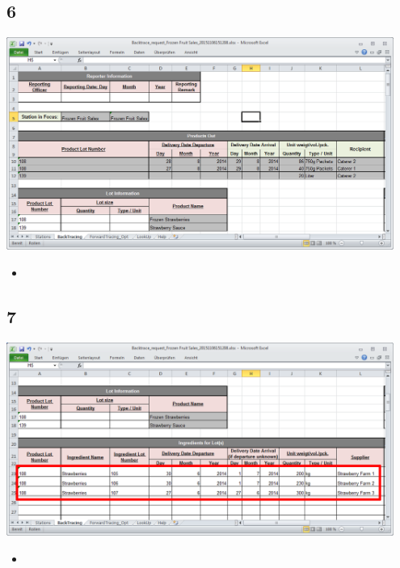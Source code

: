 \documentclass{beamer}
\begin{document}
\subsection{6}
\begin{frame}
	\begin{center}
  		\includegraphics[width=0.95\textwidth]{6.png}
	\end{center}
	\begin{itemize}
		\item
	\end{itemize}
\end{frame}

\subsection{7}
\begin{frame}
	\begin{center}
  		\includegraphics[width=0.95\textwidth]{7.png}
	\end{center}
	\begin{itemize}
		\item
	\end{itemize}
\end{frame}
\end{document}
